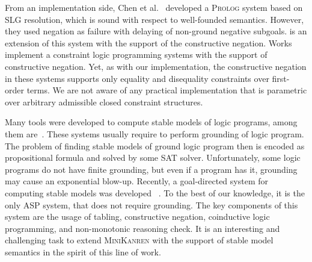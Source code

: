 From an implementation side,
Chen et al.~\cite{chen1995efficient, chen1996tabled}
developed a \textsc{Prolog} system
based on SLG resolution,
which is sound with respect to well-founded semantics.
However, they used negation as failure
with delaying of non-ground negative subgoals.
\cite{liu1999constructive} is an extension of this system
with the support of the constructive negation.
Works~\cite{bartak1998constructive, alvez2004constructive} 
implement a constraint logic programming systems
with the support of constructive negation.
Yet, as with our implementation, the
constructive negation in these systems
supports only equality and disequality
constraints over first-order terms.
We are not aware of any practical implementation 
that is parametric over arbitrary admissible closed constraint structures.

Many tools were developed to 
compute stable models of logic programs,
among them are~\cite{gebser2007clasp, giunchiglia2006answer}.
These systems usually require
to perform grounding of logic program.
The problem of finding stable models of 
ground logic program then is encoded 
as propositional formula and solved 
by some SAT solver.
Unfortunately, some logic programs
do not have finite grounding, 
but even if a program has it,
grounding may cause an exponential blow-up.
Recently, a goal-directed system
for computing stable models was developed~ 
\cite{marple2012goal, marple2017s, arias2018constraint}.
To the best of our knowledge, it is the only ASP system,
that does not require grounding.
The key components of this system are the usage of tabling, 
constructive negation, coinductive logic programming, 
and non-monotonic reasoning check.
It is an interesting and challenging task
to extend \textsc{MiniKanren} with the support of 
stable model semantics in the spirit of this line of work.
